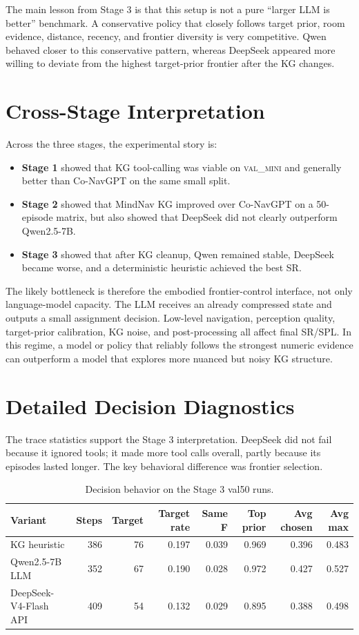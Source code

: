 \documentclass[11pt]{article}
\newcommand{\tablefont}{\footnotesize}
\begin{document}
The main lesson from Stage 3 is that this setup is not a pure ``larger LLM is
better'' benchmark. A conservative policy that closely follows target prior,
room evidence, distance, recency, and frontier diversity is very competitive.
Qwen behaved closer to this conservative pattern, whereas DeepSeek appeared
more willing to deviate from the highest target-prior frontier after the KG
changes.

\section{Cross-Stage Interpretation}

Across the three stages, the experimental story is:
\begin{itemize}
    \item \textbf{Stage 1} showed that KG tool-calling was viable on
    \textsc{val\_mini} and generally better than Co-NavGPT on the same small
    split.
    \item \textbf{Stage 2} showed that MindNav KG improved over Co-NavGPT on a
    50-episode matrix, but also showed that DeepSeek did not clearly outperform
    Qwen2.5-7B.
    \item \textbf{Stage 3} showed that after KG cleanup, Qwen remained stable,
    DeepSeek became worse, and a deterministic heuristic achieved the best SR.
\end{itemize}

The likely bottleneck is therefore the embodied frontier-control interface, not
only language-model capacity. The LLM receives an already compressed state and
outputs a small assignment decision. Low-level navigation, perception quality,
target-prior calibration, KG noise, and post-processing all affect final SR/SPL.
In this regime, a model or policy that reliably follows the strongest numeric
evidence can outperform a model that explores more nuanced but noisy KG
structure.

\section{Detailed Decision Diagnostics}

The trace statistics support the Stage 3 interpretation. DeepSeek did not fail
because it ignored tools; it made more tool calls overall, partly because its
episodes lasted longer. The key behavioral difference was frontier selection.

\begin{table}[t]
\centering
\tablefont
\caption{Decision behavior on the Stage 3 val50 runs.}
\label{tab:decision-diagnostics}
\begin{tabular}{lrrrrrrr}
\hline
Variant & Steps & Target & Target rate & Same F & Top prior & Avg chosen & Avg max \\
\hline
KG heuristic & 386 & 76 & 0.197 & 0.039 & 0.969 & 0.396 & 0.483 \\
Qwen2.5-7B LLM & 352 & 67 & 0.190 & 0.028 & 0.972 & 0.427 & 0.527 \\
DeepSeek-V4-Flash API & 409 & 54 & 0.132 & 0.029 & 0.895 & 0.388 & 0.498 \\
\hline
\end{tabular}
\end{table}
\end{document}
